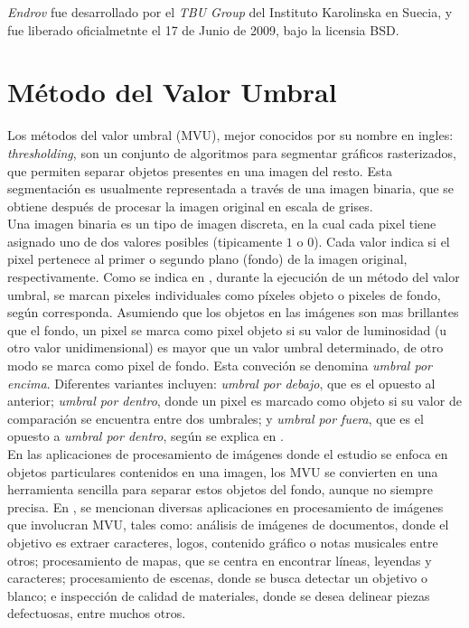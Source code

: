 \emph{Endrov} fue desarrollado por el \emph{TBU Group} del Instituto Karolinska en Suecia, y 
fue liberado oficialmetnte el 17 de Junio de 2009, bajo la licensia BSD.


\section{M\'etodo del Valor Umbral}
\label{sec:thresholding}

Los m\'etodos del valor umbral (MVU), mejor conocidos por su nombre en ingles: \emph{thresholding},
son un conjunto de algoritmos para segmentar gr\'aficos rasterizados, que permiten separar
objetos presentes en una imagen del resto. Esta segmentaci\'on es usualmente representada
a trav\'es de una imagen binaria, que se obtiene despu\'es de procesar la imagen original 
en escala de grises.\\

Una imagen binaria es un tipo de imagen discreta, en la cual cada pixel tiene asignado uno de
dos valores posibles (tipicamente $1$ o $0$). Cada valor indica si el pixel
pertenece al primer o segundo plano (fondo) de la imagen original, respectivamente.
Como se indica en \cite{web:thresholding}, durante la ejecuci\'on de un m\'etodo del valor
umbral, se marcan pixeles individuales como p\'ixeles objeto o pixeles de fondo, seg\'un
corresponda. Asumiendo que los objetos en las im\'agenes son mas brillantes que el fondo,
un pixel se marca como pixel objeto si su valor de luminosidad (u otro valor unidimensional) 
es mayor que un valor umbral determinado, de otro modo se marca como pixel de fondo.
Esta conveci\'on se denomina \emph{umbral por encima}. Diferentes variantes incluyen:
\emph{umbral por debajo}, que es el opuesto al anterior; \emph{umbral por dentro}, donde un
pixel es marcado como objeto si su valor de comparaci\'on se encuentra entre dos 
umbrales; y \emph{umbral por fuera}, que es el opuesto a \emph{umbral por dentro}, seg\'un
se explica en \cite{shapiro}.\\


En las aplicaciones de procesamiento de im\'agenes donde el estudio se enfoca en 
objetos particulares contenidos en una imagen, los MVU se convierten en una herramienta
sencilla para separar estos objetos del fondo, aunque no siempre precisa. En \cite[p.146]{thres},
se mencionan diversas aplicaciones en procesamiento de im\'agenes que involucran MVU, tales
como: an\'alisis de im\'agenes de documentos, donde el objetivo es extraer caracteres, logos,
contenido gr\'afico o notas musicales entre otros; procesamiento de mapas, que se centra en
encontrar l\'ineas, leyendas y caracteres; procesamiento de escenas, donde se busca detectar
un objetivo o blanco; e inspecci\'on de calidad de materiales, donde se desea delinear piezas
defectuosas, entre muchos otros.\\

